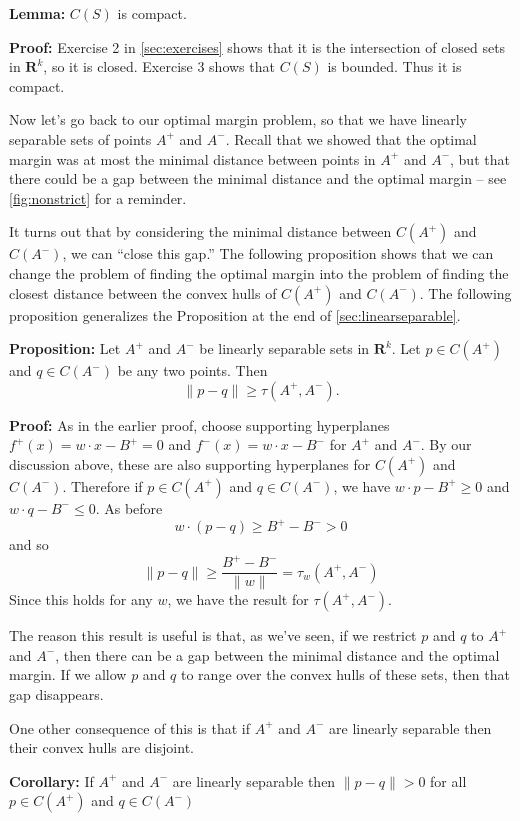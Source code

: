 \documentclass[
]{article}
\begin{document}
\textbf{Lemma:} \(C(S)\) is compact.

\textbf{Proof:} Exercise 2 in \cref{sec:exercises} shows that it is the
intersection of closed sets in \(\mathbf{R}^{k}\), so it is closed.
Exercise 3 shows that \(C(S)\) is bounded. Thus it is compact.

Now let's go back to our optimal margin problem, so that we have
linearly separable sets of points \(A^{+}\) and \(A^{-}\). Recall that
we showed that the optimal margin was at most the minimal distance
between points in \(A^{+}\) and \(A^{-}\), but that there could be a gap
between the minimal distance and the optimal margin -- see
\cref{fig:nonstrict} for a reminder.

It turns out that by considering the minimal distance between
\(C(A^{+})\) and \(C(A^{-})\), we can ``close this gap.'' The following
proposition shows that we can change the problem of finding the optimal
margin into the problem of finding the closest distance between the
convex hulls of \(C(A^{+})\) and \(C(A^{-})\). The following proposition
generalizes the Proposition at the end of \cref{sec:linearseparable}.

\textbf{Proposition:} Let \(A^{+}\) and \(A^{-}\) be linearly separable
sets in \(\mathbf{R}^{k}\). Let \(p\in C(A^{+})\) and \(q\in C(A^{-})\)
be any two points. Then \[
\|p-q\|\ge \tau(A^{+},A^{-}).
\]

\textbf{Proof:} As in the earlier proof, choose supporting hyperplanes
\(f^{+}(x)=w\cdot x-B^{+}=0\) and \(f^{-}(x)=w\cdot x-B^{-}\) for
\(A^{+}\) and \(A^{-}\). By our discussion above, these are also
supporting hyperplanes for \(C(A^{+})\) and \(C(A^{-})\). Therefore if
\(p\in C(A^{+})\) and \(q\in C(A^{-})\), we have \(w\cdot p-B^{+}\ge 0\)
and \(w\cdot q-B^{-}\le 0\). As before \[
w\cdot(p-q)\ge B^{+}-B^{-}>0
\] and so \[
\|p-q\|\ge\frac{B^{+}-B^{-}}{\|w\|}=\tau_{w}(A^{+},A^{-})
\] Since this holds for any \(w\), we have the result for
\(\tau(A^{+},A^{-})\).

The reason this result is useful is that, as we've seen, if we restrict
\(p\) and \(q\) to \(A^{+}\) and \(A^{-}\), then there can be a gap
between the minimal distance and the optimal margin. If we allow \(p\)
and \(q\) to range over the convex hulls of these sets, then that gap
disappears.

One other consequence of this is that if \(A^{+}\) and \(A^{-}\) are
linearly separable then their convex hulls are disjoint.

\textbf{Corollary:} If \(A^{+}\) and \(A^{-}\) are linearly separable
then \(\|p-q\|>0\) for all \(p\in C(A^{+})\) and \(q\in C(A^{-})\)
\end{document}
